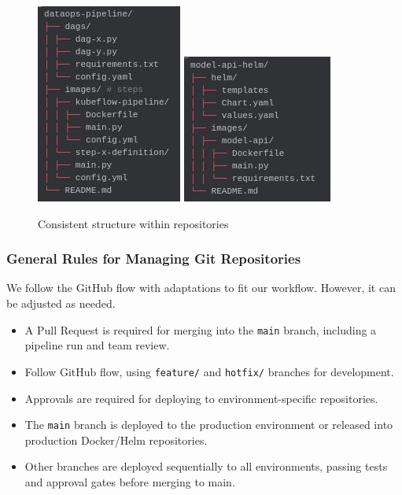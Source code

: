 \begin{figure}[h!]
    \centering
    \includegraphics[scale=0.35]{images/project/git-repo-dataops}
    \includegraphics[scale=0.35]{images/project/git-repo-helm}
    \caption{Consistent structure within repositories}
    \label{fig:sidebyside}
\end{figure}


\subsubsection{General Rules for Managing Git Repositories}
We follow the GitHub flow with adaptations to fit our workflow.
However, it can be adjusted as needed.

\begin{itemize}
    \item A Pull Request is required for merging into the \texttt{main} branch, including a pipeline run and team review.
    \item Follow GitHub flow, using \texttt{feature/} and \texttt{hotfix/} branches for development.
    \item Approvals are required for deploying to environment-specific repositories.
    \item The \texttt{main} branch is deployed to the production environment or released into production Docker/Helm repositories.
    \item Other branches are deployed sequentially to all environments, passing tests and approval gates before merging to main.
\end{itemize}

